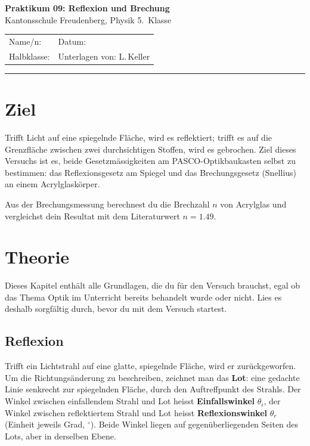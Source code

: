 \documentclass[11pt,a4paper]{article}
\begin{document}
\thispagestyle{empty}

\begin{center}
  {\color{kfrblue}\Large\bfseries Praktikum 09: Reflexion und Brechung}\\[2pt]
  {\normalsize Kantonsschule Freudenberg, Physik 5.\ Klasse}
\end{center}

\vspace{4pt}
\noindent
\begin{tabularx}{\linewidth}{@{}X X@{}}
  Name/n: \dotfill & Datum: \dotfill \\[4pt]
  Halbklasse: \dotfill & Unterlagen von: L.\,Keller \\
\end{tabularx}

\vspace{10pt}
\hrule
\vspace{10pt}

\section{Ziel}
Trifft Licht auf eine spiegelnde Fläche, wird es reflektiert; trifft es auf die Grenzfläche zwischen zwei durchsichtigen Stoffen, wird es gebrochen. Ziel dieses Versuchs ist es, beide Gesetzmässigkeiten am PASCO-Optikbaukasten selbst zu bestimmen: das Reflexionsgesetz am Spiegel und das Brechungsgesetz (Snellius) an einem Acrylglaskörper.

Aus der Brechungsmessung berechnest du die Brechzahl $n$ von Acrylglas und vergleichst dein Resultat mit dem Literaturwert $n=1.49$.

\section{Theorie}
\label{sec:theorie}
Dieses Kapitel enthält alle Grundlagen, die du für den Versuch brauchst, egal ob das Thema Optik im Unterricht bereits behandelt wurde oder nicht. Lies es deshalb sorgfältig durch, bevor du mit dem Versuch startest.

\subsection{Reflexion}
Trifft ein Lichtstrahl auf eine glatte, spiegelnde Fläche, wird er zurückgeworfen. Um die Richtungsänderung zu beschreiben, zeichnet man das \textbf{Lot}: eine gedachte Linie senkrecht zur spiegelnden Fläche, durch den Auftreffpunkt des Strahls. Der Winkel zwischen einfallendem Strahl und Lot heisst \textbf{Einfallswinkel} $\theta_i$, der Winkel zwischen reflektiertem Strahl und Lot heisst \textbf{Reflexionswinkel} $\theta_r$ (Einheit jeweils Grad, $^\circ$). Beide Winkel liegen auf gegenüberliegenden Seiten des Lots, aber in derselben Ebene.
\end{document}
